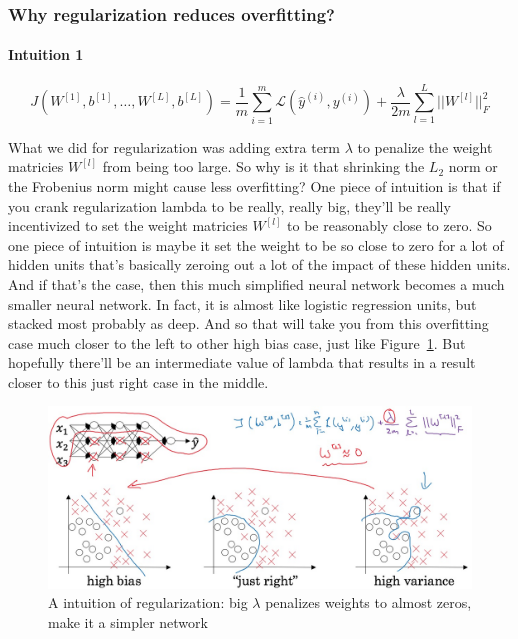 \documentclass[UTF8]{article}
\newcommand{\Vector}[1]{\boldsymbol{\mathit{#1}}}   %
\newcommand{\Matrix}[1]{\boldsymbol{\mathit{#1}}}   %
\newcommand{\Cal}[1]{\mathcal{#1}}                  %
\begin{document}
\subsubsection{Why regularization reduces overfitting?}
\paragraph{Intuition 1}
$$ J(\Matrix{W^{[1]}}, \Vector{b^{[1]}}, \ldots, \Matrix{W}^{[L]}, \Vector{b}^{[L]})
= \frac{1}{m} \sum_{i=1}^{m} \Cal{L}(\hat{\Vector{y}}^{(i)}, \Vector{y}^{(i)})
+ \frac{\lambda}{2m} \sum_{l=1}^L ||\Matrix{W}^{[l]}||_F^2 $$

What we did for regularization was adding extra term $\lambda$ to penalize the weight matricies
$\Matrix{W}^{[l]}$ from being too large. So why is it that shrinking the $L_2$ norm or the
Frobenius norm might cause less overfitting? One piece of intuition is that if you crank
regularization lambda to be really, really big, they'll be really incentivized to set the weight
matricies $\Matrix{W}^{[l]}$ to be reasonably close to zero. So one piece of intuition is maybe it
set the weight to be so close to zero for a lot of hidden units that's basically zeroing out a lot
of the impact of these hidden units. And if that's the case, then this much simplified neural
network becomes a much smaller neural network. In fact, it is almost like logistic regression
units, but stacked most probably as deep. And so that will take you from this overfitting case much
closer to the left to other high bias case, just like Figure~\ref{fig:regularization-intuition-1}.
But hopefully there'll be an intermediate value of lambda that results in a result closer to this
just right case in the middle.

\begin{figure}[htb]
    \centering
    \includegraphics[width=40em]{figures/regularization-intuition-1}
    \caption{A intuition of regularization: big $\lambda$ penalizes weights to almost zeros, make
    it a simpler network}
    \label{fig:regularization-intuition-1}
\end{figure}
\end{document}
